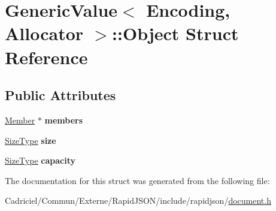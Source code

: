 \hypertarget{struct_generic_value_1_1_object}{}\section{Generic\+Value$<$ Encoding, Allocator $>$\+:\+:Object Struct Reference}
\label{struct_generic_value_1_1_object}
\subsection*{Public Attributes}
\begin{DoxyCompactItemize}
\item 
\hyperlink{class_generic_value_a7ccf27c44058b4c11c3efc6473afb886}{Member} $\ast$ {\bfseries members}\hypertarget{struct_generic_value_1_1_object_ab51b8366577cb12f0280e4a6d7dab926}{}\label{struct_generic_value_1_1_object_ab51b8366577cb12f0280e4a6d7dab926}

\item 
\hyperlink{rapidjson_8h_a5ed6e6e67250fadbd041127e6386dcb5}{Size\+Type} {\bfseries size}\hypertarget{struct_generic_value_1_1_object_a10da3d9035961100ed11f955a4afd2b6}{}\label{struct_generic_value_1_1_object_a10da3d9035961100ed11f955a4afd2b6}

\item 
\hyperlink{rapidjson_8h_a5ed6e6e67250fadbd041127e6386dcb5}{Size\+Type} {\bfseries capacity}\hypertarget{struct_generic_value_1_1_object_ab22a81c7ac57baf0d4ea343dfd6d8b33}{}\label{struct_generic_value_1_1_object_ab22a81c7ac57baf0d4ea343dfd6d8b33}

\end{DoxyCompactItemize}


The documentation for this struct was generated from the following file\+:\begin{DoxyCompactItemize}
\item 
Cadriciel/\+Commun/\+Externe/\+Rapid\+J\+S\+O\+N/include/rapidjson/\hyperlink{document_8h}{document.\+h}\end{DoxyCompactItemize}
